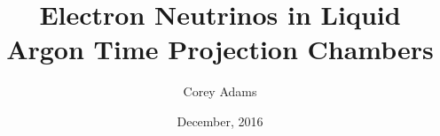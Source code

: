 


\title{Electron Neutrinos in Liquid Argon Time Projection Chambers}
\author{Corey Adams}
\date{December, 2016} %

\frontmatter



\maketitle


\tableofcontents
\listoffigures %
\listoftables %